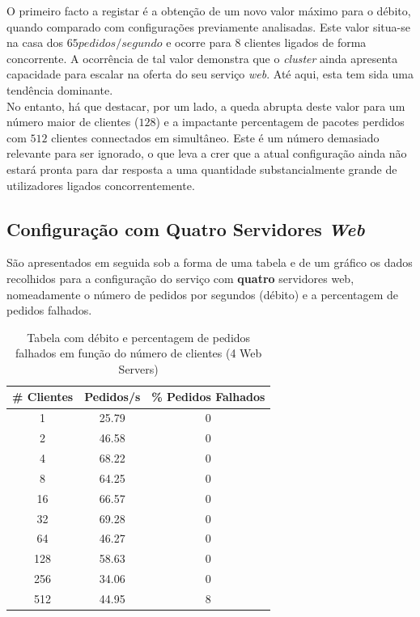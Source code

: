 \newpage


O primeiro facto a registar é a obtenção de um novo valor máximo para o débito, quando comparado com configurações previamente analisadas.
Este valor situa-se na casa dos $65 pedidos/segundo$ e ocorre para $8$ clientes ligados de forma concorrente.
A ocorrência de tal valor demonstra que o \textit{cluster} ainda apresenta capacidade para escalar na oferta do seu serviço \textit{web}.
Até aqui, esta tem sida uma tendência dominante. \\

No entanto, há que destacar, por um lado, a queda abrupta deste valor para um número maior de clientes ($128$) e a impactante percentagem de pacotes perdidos com $512$ clientes connectados em simultâneo.
Este é um número demasiado relevante para ser ignorado, o que leva a crer que a atual configuração ainda não estará pronta para dar resposta a uma quantidade substancialmente grande de utilizadores ligados concorrentemente.

\subsection{Configuração com Quatro Servidores \textit{Web}}


São apresentados em seguida sob a forma de uma tabela e de um gráfico os dados recolhidos para a configuração do serviço com \textbf{quatro} servidores web, nomeadamente o número de pedidos por segundos (débito) e a percentagem de pedidos falhados. \\

\begin{table}[!h]
\centering
\begin{tabular}{|c|c|c|}
\hline
\textbf{\# Clientes} & \textbf{Pedidos/s} & \textbf{\% Pedidos Falhados} \\ \hline
1 & 25.79 & 0 \\ \hline
2 & 46.58 & 0 \\ \hline
4 & 68.22 & 0 \\ \hline
8 & 64.25 & 0 \\ \hline
16 & 66.57 & 0 \\ \hline
32 & 69.28 & 0 \\ \hline
64 & 46.27 & 0 \\ \hline
128 & 58.63 & 0 \\ \hline
256 & 34.06 & 0 \\ \hline
512 & 44.95 & 8 \\ \hline
\end{tabular}
\caption{Tabela com débito e percentagem de pedidos falhados em função do número de clientes (4 Web Servers)}
\end{table}

